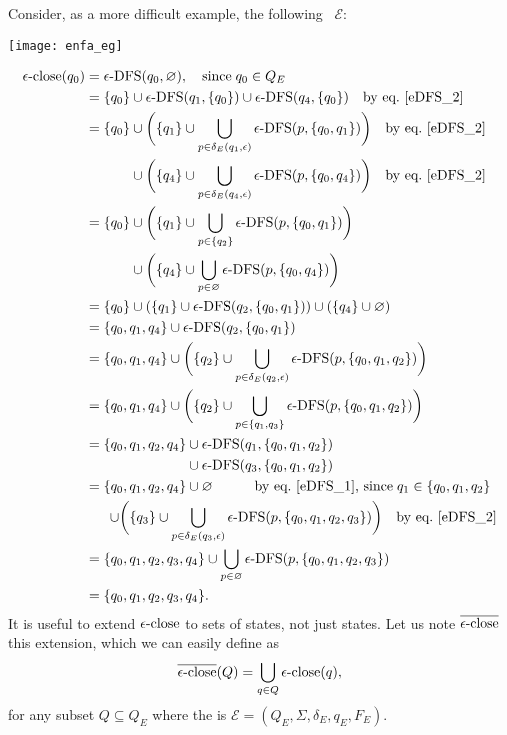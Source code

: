Consider, as a more difficult example, the following
\eNFA~\(\mathcal{E}\):
\begin{center}
\texttt{[image: enfa\_eg]}
\end{center}
\begin{align*}
\eClose (q_0)
  &= \eDFS (q_0, \varnothing), \quad \text{since} \; q_0 \in Q_E\\
  &= \{q_0\} \cup \eDFS (q_1, \{q_0\}) \cup \eDFS (q_4, \{q_0\})
     \quad \text{by eq.~\ref{eDFS_2}}\\
  &= \{q_0\} \cup \biggl( \{q_1\} \cup
     \bigcup_{p \in \delta_E(q_1,\epsilon)}{\eDFS (p, \{q_0, q_1\})}\biggr)
     \quad \text{by eq.~\ref{eDFS_2}}\\
  &\mathrel{\phantom{=}} \phantom{\{q_0\}}{} 
     \cup \biggl( \{q_4\} \cup 
     \bigcup_{p \in \delta_E(q_4,\epsilon)}{\eDFS (p, \{q_0, q_4\})} \biggr)
     \quad \text{by eq.~\ref{eDFS_2}}\\
  &= \{q_0\} \cup \biggl( \{q_1\} \cup
     \bigcup_{p \in \{q_2\}}{\eDFS (p, \{q_0, q_1\})}\biggr)\\
  &\mathrel{\phantom{=}} \phantom{\{q_0\}}{} 
     \cup \biggl( \{q_4\} \cup \bigcup_{p \in \varnothing}{\eDFS (p,
     \{q_0, q_4\})} \biggr)\\
  &= \{q_0\} \cup (\{q_1\} \cup \eDFS (q_2, \{q_0, q_1\}))
     \cup (\{q_4\} \cup \varnothing)\\
  &= \{q_0, q_1, q_4\} \cup \eDFS (q_2, \{q_0, q_1\})\\
  &= \{q_0, q_1, q_4\} \cup \biggl(\{q_2\} \cup \bigcup_{p \in
     \delta_E(q_2,\epsilon)}{\eDFS (p, \{q_0, q_1, q_2\})}\biggr)\\
  &= \{q_0, q_1, q_4\} \cup \biggl(\{q_2\} \cup \bigcup_{p \in
     \{q_1, q_3\}}{\eDFS (p, \{q_0, q_1, q_2\})}\biggr)\\
  &= \{q_0, q_1, q_2, q_4\} \cup \eDFS (q_1, \{q_0, q_1, q_2\})\\
  &\mathrel{\phantom{=}} \phantom{\{q_0,q_2,q_2,q_4\}} \cup \eDFS
     (q_3, \{q_0, q_1, q_2\})\\
  &= \{q_0, q_1, q_2, q_4\} \cup \varnothing \qquad\quad
     \text{by eq.~\ref{eDFS_1}, since} \; q_1 \in \{q_0, q_1, q_2\}\\
  &\mathrel{\phantom{=}} \;\,
     \cup \biggl(\{q_3\} \cup
     \bigcup_{p \in \delta_E(q_3, \epsilon)}{\eDFS (p, \{q_0, q_1, q_2, q_3\})}\biggr)
     \quad \text{by eq.~\ref{eDFS_2}}\\
  &= \{q_0, q_1, q_2, q_3, q_4\} \cup \bigcup_{p \in
     \varnothing}{\eDFS (p, \{q_0, q_1, q_2, q_3\})}\\
  &= \{q_0, q_1, q_2, q_3, q_4\}.
\end{align*}
It is useful to extend \(\epsilon\text{-close}\) to sets of states, not just
states. Let us note \(\overline{\epsilon\text{-close}}\) this extension, which we can easily
define as
\begin{equation*}
\overline{\epsilon\text{-close}} (Q) = \bigcup_{q \in Q}{\epsilon\text{-close} (q)},
\end{equation*}
for any subset \(Q \subseteq Q_E\) where the \eNFA is \(\mathcal{E} =
(Q_E, \Sigma, \delta_E, q_E, F_E)\).

